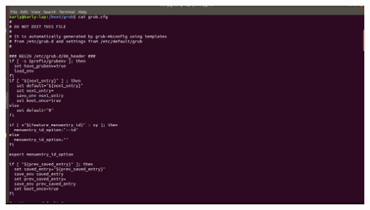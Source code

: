 \documentclass[a4paper, 11pt, oneside]{article}
\begin{document}
\begin{center}
 \includegraphics[scale=0.20]{21202.png}
\end{center}
\end{document}

